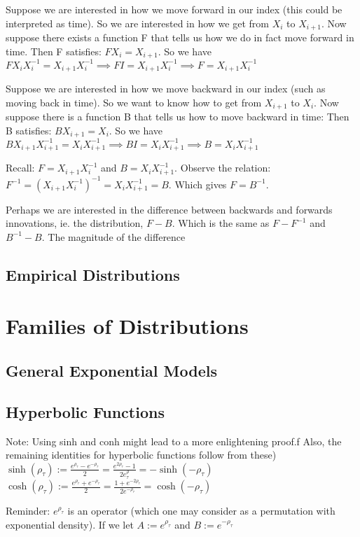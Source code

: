 \documentclass{article}
\theoremstyle{definition}
\begin{document}
Suppose we are interested in how we move forward in our index (this could be interpreted as time). So we are interested in how we get from $X_i$ to $X_{i+1}$. Now suppose there exists a function F that tells us how we do in fact move forward in time.
Then F satisfies: $F X_i = X_{i+1} $. So we have $FX_i X_i^{-1} = X_{i+1}X_i^{-1} \implies FI = X_{i+1}X_i^{-1} \implies F = X_{i+1}X_i^{-1} $ 

Suppose we are interested in how we move backward in our index (such as moving back in time). So we want to know how to get from $X_{i+1}$ to $X_i$. Now suppose there is a function B that tells us how to move backward in time:
Then B satisfies: $BX_{i+1}= X_i$. So we have $BX_{i+1}X_{i+1}^{-1} = X_i X_{i+1}^{-1} \implies B I = X_i X_{i+1}^{-1} \implies  B = X_i X_{i+1}^{-1} $

Recall: $ F = X_{i+1}X_{i}^{-1}$ and $B = X_{i}X_{i+1}^{-1}$. Observe the relation: $F^{-1} = (X_{i+1}X_{i}^{-1})^{-1} = X_{i}X_{i+1}^{-1} = B$. Which gives $F = B^{-1}$.

Perhaps we are interested in the difference between backwards and forwards innovations, ie. the distribution, $F - B$. Which is the same as $F - F^{-1}$ and $B^{-1} - B$. The magnitude of the difference 


\subsection{Empirical Distributions}

\section{Families of Distributions}
\subsection{General Exponential Models}
\subsection{Hyperbolic Functions}
Note: Using sinh and conh might lead to a more enlightening proof.f
Also, the remaining identities for hyperbolic functions follow from these)
$\sinh(\rho_\tau) := \frac{e^{\rho_\tau} - e^{-\rho_\tau}}{2} = \frac{e^{2\rho_\tau} - 1}{2e^\rho_\tau} = -\sinh(-\rho_\tau)$
$\cosh(\rho_\tau) := \frac{e^{\rho_\tau} + e^{-\rho_\tau}}{2} = \frac{1+e^{-2\rho_\tau}}{2e^{-\rho_\tau}}= \cosh(-\rho_\tau)$

Reminder: $e^{\rho_\tau}$ is an operator (which one may consider as a permutation with exponential density). If we let $A := e^{\rho_\tau} $ and $B:= e^{-\rho_\tau}$
\end{document}
